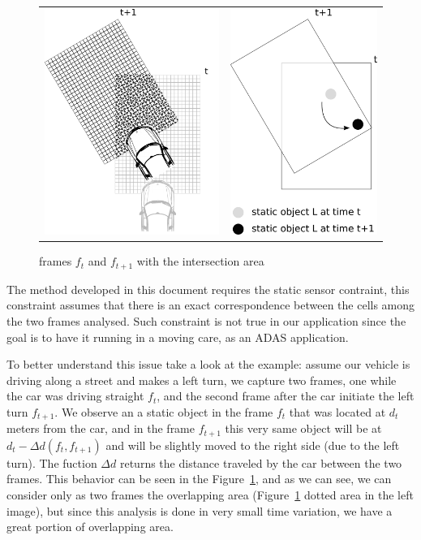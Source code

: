\begin{figure}[h]
   \centering
     \begin{tabular}{lr}
       \includegraphics[width=0.35\columnwidth]{img/fig:motion:algorithm:nonstatic:01}
       & \includegraphics[width=0.3\columnwidth]{img/fig:motion:algorithm:nonstatic:02}
     \end{tabular}
   \caption{frames $f_t$ and $f_{t+1}$ with the intersection area}
   \label{fig:motion:algorithm:nonstatic:01}
 \end{figure}

The method developed in this document requires the static sensor contraint, this constraint assumes that there is an exact correspondence between the cells among the two frames analysed. Such constraint is not true in our application since the goal is to have it running in a moving care, as an ADAS application. 

To better understand this issue take a look at the example: assume our vehicle is driving along a street and makes a left turn, we capture two frames, one while the car was driving straight $f_t$, and the second frame  after the car initiate the left turn $f_{t+1}$. We observe an a static object in the frame $f_t$ that was located at $d_t$ meters from the car, and in the frame $f_{t+1}$ this very same object will be at $d_t-\Delta d(f_t,f_{t+1})$ and will be slightly moved to the right side (due to the left turn). The fuction $\Delta d$ returns the distance traveled by the car between the two frames. This behavior can be seen in the Figure~\ref{fig:motion:algorithm:nonstatic:01}, and as we can see, we can consider only as two frames the overlapping area (Figure~\ref{fig:motion:algorithm:nonstatic:01} dotted area in the left image), but since this analysis is done in very small time variation, we have a great portion of overlapping area.

